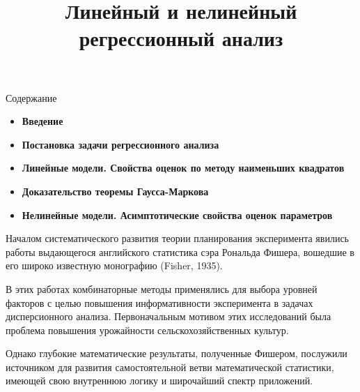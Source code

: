 \documentclass[10pt,slidestop,usepdftitle=false]{beamer}
\title[Линейный и нелинейный регрессионный анализ] 
{Линейный и нелинейный регрессионный анализ}
\author{}
\date{}
\begin{document}
\newtheorem{defin}{Определение}
\newtheorem{mytheorem}{Теорема}
\newtheorem{mylemma}{Лемма}
\newtheorem{proposition}{Утверждение}
\newtheorem{algorithm}{Алгоритм}
\newtheorem{rem}{Замечание}

\begin{frame}
  \maketitle
\end{frame}

\begin{frame}{Содержание}
 \begin{itemize}
 
 \bigskip 

 \item

{\bf Введение}

\bigskip 
\bigskip
\pause    
 \item
 
{\bf 
 Постановка задачи регрессионного анализа} 
\bigskip 
\bigskip 
\pause 
 \item
 
 
{\bf Линейные модели. Свойства оценок по методу наименьших квадратов} 
 
 \bigskip 
\bigskip 
\pause
 \item
 
 
 {\bf Доказательство
теоремы Гаусса-Маркова}

\bigskip 
\bigskip 
\pause 
 \item

{\bf Нелинейные модели. Асимптотические свойства оценок параметров} 


\end{itemize}
\end{frame}
\begin{frame}
Началом систематического развития теории планирования эксперимента явились работы выдающегося английского статистика сэра Рональда Фишера, вошедшие в его широко известную монографию (Fisher, 1935). 

\bigskip
\pause

В этих работах комбинаторные методы применялись для выбора уровней факторов с целью повышения информативности эксперимента в задачах дисперсионного анализа. Первоначальным мотивом этих исследований была проблема повышения урожайности сельскохозяйственных культур.

\bigskip
\bigskip
\pause

 Однако глубокие математические результаты, полученные Фишером, послужили источником для развития самостоятельной ветви математической статистики, имеющей свою внутреннюю логику и широчайший спектр приложений.

\end{frame}
\end{document}
